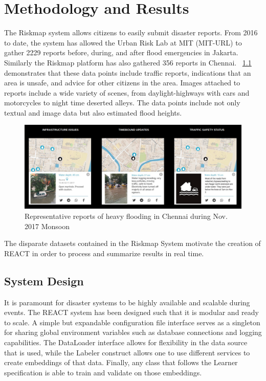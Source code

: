 \chapter{Methodology and Results}
The Riskmap system allows citizens to easily submit
disaster reports. From 2016 to date, the system has allowed the Urban Risk Lab
at MIT (MIT-URL) to gather 2229 reports before, during, and after flood
emergencies in Jakarta. Similarly the Riskmap platform has also gathered 356
reports in Chennai. \figureautorefname{}~\ref{fig:ch_typical_reports} demonstrates
that these data points include traffic reports, indications
that an area is unsafe, and advice for other citizens in the area.  Images
attached to reports include a wide variety of scenes, from daylight-highways
with cars and motorcycles to night time deserted alleys. The data points include
not only textual and image data but also estimated flood heights.

\begin{figure}[ht]
    \centering
    \captionsetup{justification=centering}
    \includegraphics[width=\textwidth]{images/ch/typical_reports.png}
    \caption{Representative reports of heavy flooding in Chennai during Nov.
    2017 Monsoon }\label{fig:ch_typical_reports}
\end{figure}

The disparate datasets contained in the Riskmap System motivate the creation of
REACT in order to process and summarize results in real time.

\section{System Design}
It is paramount for disaster systems to be highly available and scalable during
events. The REACT system has been designed such that it is modular and ready to
scale. A simple but expandable configuration file interface serves as a
singleton for sharing global environment variables such as database connections
and logging capabilities. The DataLoader interface allows for flexibility in the
data source that is used, while the Labeler construct allows one to use
different services to create embeddings of that data. Finally, any class that
follows the Learner specification is able to train and validate on those
embeddings.

